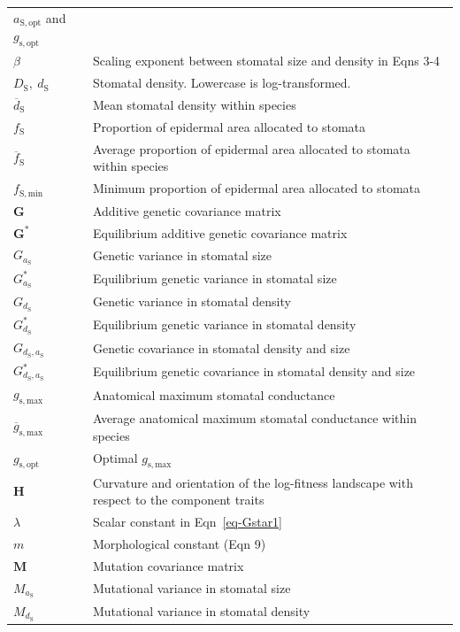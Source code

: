 \documentclass[
  letterpaper,
  DIV=11,
  numbers=noendperiod]{scrartcl}
\begin{document}
\begin{longtable}[]{@{}
  >{\raggedright\arraybackslash}p{}
  >{\raggedright\arraybackslash}p{}@{}}
\(a_\mathrm{S,opt}\) and \(g_\mathrm{s,opt}\) \\
\(\beta\) & Scaling exponent between stomatal size and density in Eqns
3-4 \\
\(D_\mathrm{S},~d_\mathrm{S}\) & Stomatal density. Lowercase is
log-transformed. \\
\(\overline{d}_\mathrm{S}\) & Mean stomatal density within species \\
\(f_\mathrm{S}\) & Proportion of epidermal area allocated to stomata \\
\(\overline{f}_\mathrm{S}\) & Average proportion of epidermal area
allocated to stomata within species \\
\(f_\mathrm{S,min}\) & Minimum proportion of epidermal area allocated to
stomata \\
\(\mathbf{G}\) & Additive genetic covariance matrix \\
\(\mathbf{G}^*\) & Equilibrium additive genetic covariance matrix \\
\(G_{a_\mathrm{S}}\) & Genetic variance in stomatal size \\
\(G^*_{a_\mathrm{S}}\) & Equilibrium genetic variance in stomatal
size \\
\(G_{d_\mathrm{S}}\) & Genetic variance in stomatal density \\
\(G^*_{d_\mathrm{S}}\) & Equilibrium genetic variance in stomatal
density \\
\(G_{d_\mathrm{S},a_\mathrm{S}}\) & Genetic covariance in stomatal
density and size \\
\(G^*_{d_\mathrm{S},a_\mathrm{S}}\) & Equilibrium genetic covariance in
stomatal density and size \\
\(g_\mathrm{s,max}\) & Anatomical maximum stomatal conductance \\
\(\overline{g}_\mathrm{s,max}\) & Average anatomical maximum stomatal
conductance within species \\
\(g_\mathrm{s,opt}\) & Optimal \(g_\mathrm{s,max}\) \\
\(\mathbf{H}\) & Curvature and orientation of the log-fitness landscape
with respect to the component traits \\
\(\lambda\) & Scalar constant in Eqn~\ref{eq-Gstar1} \\
\(m\) & Morphological constant (Eqn 9) \\
\(\mathbf{M}\) & Mutation covariance matrix \\
\(M_{a_\mathrm{S}}\) & Mutational variance in stomatal size \\
\(M_{d_\mathrm{S}}\) & Mutational variance in stomatal density \\

\end{longtable}
\end{document}
